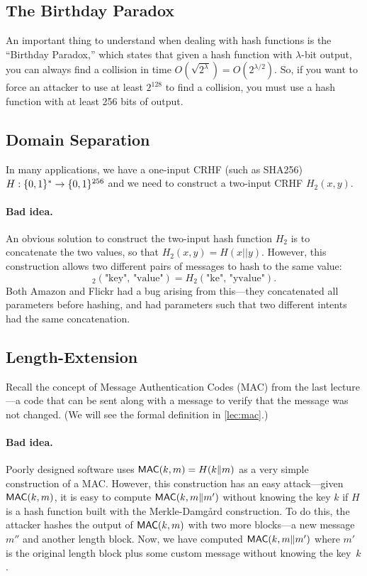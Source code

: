 \subsection{The Birthday Paradox}
An important thing to understand when dealing with hash functions is the ``Birthday Paradox,'' 
which states that given a hash function with $\lambda$-bit output, you can 
always find a collision in time $O(\sqrt{2^\lambda}) = O(2^{\lambda/2})$.
So, if you want to force an attacker to use at least $2^{128}$ to find a collision,
you must use a hash function with at least 256 bits of output.

\subsection{Domain Separation}
In many applications, we have a one-input CRHF (such as SHA256) $H: \{0,1\}^* \rightarrow \{0,1\}^{256}$ 
and we need to construct a two-input CRHF $H_2(x, y)$. 

\paragraph{Bad idea.} An obvious solution to construct the two-input hash function $H_2$ 
is to concatenate the two values, so that $H_2(x, y) = H(x || y)$.
However, this construction allows two different pairs of messages to hash to the same value:
\[ _2(\text{"key", "value"}) = H_2(\text{"ke", "yvalue"}).\]
Both Amazon and Flickr had a bug arising from
this---they concatenated all parameters before
hashing, and had parameters such that two
different intents had the same concatenation.\cite{flickr}

\subsection{Length-Extension}
Recall the concept of Message Authentication Codes
(MAC) from the last lecture---a code that can be
sent along with a message to verify that the message was not changed.
(We will see the formal definition in \cref{lec:mac}.)

\paragraph{Bad idea.}
Poorly designed software uses $\mathsf{MAC}(k, m) = H(k \| m)$ as a very simple construction of a MAC.
However, this construction has an easy attack---given $\mathsf{MAC}(k, m)$, it is easy to compute $\mathsf{MAC}(k, m\|m')$ 
without knowing the key $k$ if $H$ is a hash function built with the Merkle-Damg\aa{}rd construction.
To do this, the attacker hashes the output of $\mathsf{MAC}(k, m)$ with two more blocks---a new 
message $m''$ and another length block. Now, we
have computed $\mathsf{MAC}(k, m\|m')$ where $m'$ is the
original length block plus some custom message
without knowing the key~$k$. 

